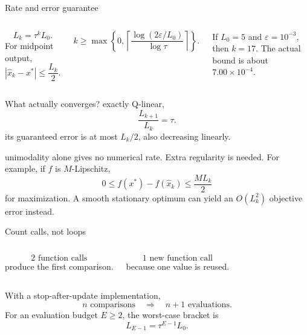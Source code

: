 \documentclass[aspectratio=169,11pt,t]{beamer}
\begin{document}
\begin{frame}{Rate and error guarantee}
  \begin{columns}[T,onlytextwidth]
      \[
        L_k=\tau^kL_0.
      \]
      For midpoint output,
      \[
        |\widehat{x}_k-x^*|\le\frac{L_k}{2}.
      \]

      \[
        k\ge\max\left\{0,\left\lceil
        \frac{\log(2\varepsilon/L_0)}{\log\tau}
        \right\rceil\right\}.
      \]
      \begin{keyidea}[Example]
        If \(L_0=5\) and \(\varepsilon=10^{-3}\), then \(k=17\). The actual
        bound is about \(7.00\times10^{-4}\).
      \end{keyidea}
  \end{columns}
\end{frame}

\begin{frame}{What actually converges?}
   exactly Q-linear,
  \[
    \frac{L_{k+1}}{L_k}=\tau.
  \]
   its guaranteed error is at most \(L_k/2\), also
  decreasing linearly.

  \vspace{0.18cm}
   unimodality alone gives no numerical rate. Extra
  regularity is needed. For example, if \(f\) is \(M\)-Lipschitz,
  \[
    0\le f(x^*)-f(\widehat{x}_k)\le \frac{M L_k}{2}
  \]
  for maximization. A smooth stationary optimum can yield an
  \(O(L_k^2)\) objective error instead.
\end{frame}

\begin{frame}{Count calls, not loops}
  \begin{columns}[T,onlytextwidth]
      \[
        2\text{ function calls}
      \]
      produce the first comparison.

      \[
        1\text{ new function call}
      \]
      because one value is reused.
  \end{columns}

  \vspace{0.22cm}
  With a stop-after-update implementation,
  \[
    n\text{ comparisons}\quad\Longrightarrow\quad n+1\text{ evaluations}.
  \]
  For an evaluation budget \(E\ge2\), the worst-case bracket is
  \[
    L_{E-1}=\tau^{E-1}L_0.
  \]
\end{frame}
\end{document}
